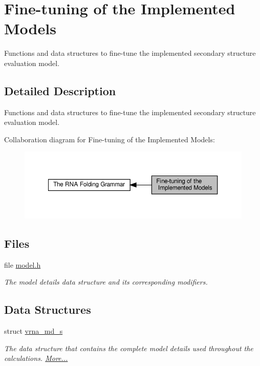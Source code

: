 \hypertarget{group__model__details}{}\section{Fine-\/tuning of the Implemented Models}
\label{group__model__details}


Functions and data structures to fine-\/tune the implemented secondary structure evaluation model.  




\subsection{Detailed Description}
Functions and data structures to fine-\/tune the implemented secondary structure evaluation model. 

Collaboration diagram for Fine-\/tuning of the Implemented Models\+:
\nopagebreak
\begin{figure}[H]
\begin{center}
\leavevmode
\includegraphics[width=350pt]{group__model__details}
\end{center}
\end{figure}
\subsection*{Files}
\begin{DoxyCompactItemize}
\item 
file \hyperlink{model_8h}{model.\+h}
\begin{DoxyCompactList}\small\item\em The model details data structure and its corresponding modifiers. \end{DoxyCompactList}\end{DoxyCompactItemize}
\subsection*{Data Structures}
\begin{DoxyCompactItemize}
\item 
struct \hyperlink{group__model__details_structvrna__md__s}{vrna\+\_\+md\+\_\+s}
\begin{DoxyCompactList}\small\item\em The data structure that contains the complete model details used throughout the calculations.  \hyperlink{group__model__details_structvrna__md__s}{More...}\end{DoxyCompactList}\end{DoxyCompactItemize}
